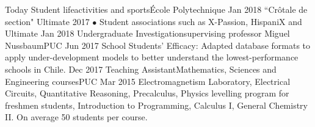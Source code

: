 %
%
%

\begin{experiences}
\experience
    {Today} {Student life}{activities and sports}{École Polytechnique}
    {Jan 2018} {``Crôtale de section" Ultimate 2017 $\bullet$ Student associations such as X-Passion, HispaniX and Ultimate}
        {}
\experience
    {Jan 2018} {Undergraduate Investigation}{supervising professor Miguel Nussbaum}{PUC}
    {Jun 2017} {School Students' Efficacy: Adapted database formats to apply under-development models to better understand the lowest-performance schools in Chile.}
        {}
  \experience
    {Dec 2017} {Teaching Assistant}{Mathematics, Sciences and Engineering courses}{PUC}
    {Mar 2015} 
    {Electromagnetism Laboratory, Electrical Circuits, Quantitative Reasoning, Precalculus, Physics levelling program for freshmen students, Introduction to Programming, Calculus I, General Chemistry II. On average 50 students per course.}
        {}
\end{experiences}